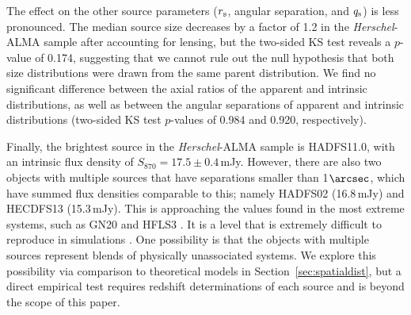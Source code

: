 \documentclass[iop]{emulateapj}
\begin{document}
The effect on the other source parameters ($r_{\rm s}$, angular separation, and
$q_{\rm s}$) is less pronounced.  The median source size decreases by a factor
of 1.2 in the {\it Herschel}-ALMA sample after accounting for lensing, but the
two-sided KS test reveals a $p$-value of 0.174, suggesting that we cannot rule
out the null hypothesis that both size distributions were drawn from the same
parent distribution.  We find no significant difference between the axial
ratios of the apparent and intrinsic distributions, as well as between the
angular separations of apparent and intrinsic distributions (two-sided KS test
$p$-values of 0.984 and 0.920, respectively). 


Finally, the brightest source in the {\it Herschel}-ALMA sample is HADFS11.0,
with an intrinsic flux density of $S_{870} = 17.5 \pm 0.4\,$mJy.  However,
there are also two objects with multiple sources that have separations smaller
than 1$\arcsec$, which have summed flux densities comparable to this; namely
HADFS02 (16.8$\,$mJy) and HECDFS13 (15.3$\,$mJy).  This is approaching the
values found in the most extreme systems, such as GN20
\citep[20.6$\,$mJy,][]{2006MNRAS.370.1185P} and HFLS3
\citep[15-20$\,$mJy;][]{Riechers:2013lr, Cooray:2014rm, Robson:2014xy}.  It is
a level that is extremely difficult to reproduce in simulations
\citep[e.g.,][]{Narayanan:2010lr}.  One possibility is that the objects with
multiple sources represent blends of physically unassociated systems.  We
explore this possibility via comparison to theoretical models in
Section~\ref{sec:spatialdist}, but a direct empirical test requires redshift
determinations of each source and is beyond the scope of this paper.
\end{document}
